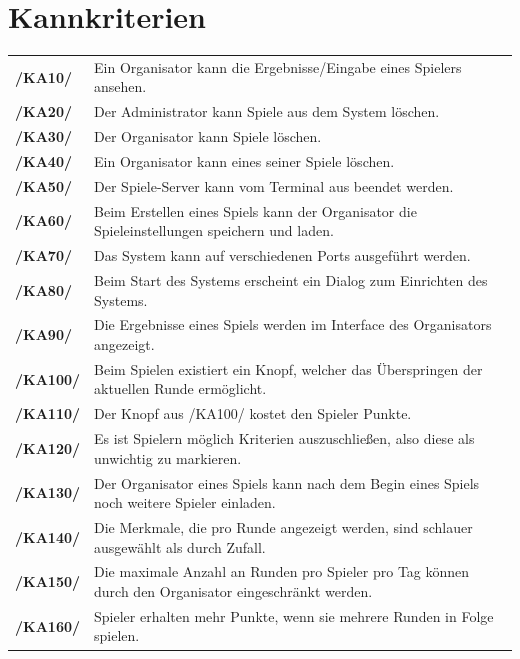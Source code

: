 \documentclass[a4paper]{scrreprt}
\begin{document}
    \section{Kannkriterien}
    \begin{tabularx}{\linewidth}{@{}>{\bfseries}l@{\hspace{.5em}}X@{}} %
        /KA10/ & Ein \Gls{Organisator} kann die Ergebnisse/Eingabe eines Spielers ansehen. \\
        /KA20/ & Der \Gls{Administrator} kann Spiele aus dem System löschen. \\
        /KA30/ & Der \Gls{Organisator} kann Spiele löschen. \\
        /KA40/ & Ein \Gls{Organisator} kann eines seiner \Gls{Spiel}e löschen. \\
        /KA50/ & Der \Gls{Spiele-Server} kann vom Terminal aus beendet werden. \\
        /KA60/ & Beim Erstellen eines Spiels kann der \Gls{Organisator} die \Gls{Spieleinstellungen} speichern und laden. \\
        /KA70/ & Das System kann auf verschiedenen Ports ausgeführt werden. \\
        /KA80/ & Beim Start des Systems erscheint ein Dialog zum Einrichten des Systems. \\
        /KA90/ & Die Ergebnisse eines \Gls{Spiel}s werden im Interface des \Gls{Organisator}s angezeigt. \\
        /KA100/ & Beim Spielen existiert ein Knopf, welcher das Überspringen der aktuellen Runde ermöglicht. \\
        /KA110/ & Der Knopf aus /KA100/ kostet den \Gls{Spieler} Punkte. \\ %
        /KA120/ & Es ist \Gls{Spieler}n möglich Kriterien auszuschließen, also diese als unwichtig zu markieren. \\
        /KA130/ & Der \Gls{Organisator} eines Spiels kann nach dem Begin eines Spiels noch weitere Spieler einladen. \\
        /KA140/ & Die Merkmale, die pro Runde angezeigt werden, sind schlauer ausgewählt als durch Zufall. \\ %
        /KA150/ & Die maximale Anzahl an Runden pro Spieler pro Tag können durch den \Gls{Organisator} eingeschränkt werden. \\
        /KA160/ & \Gls{Spieler} erhalten mehr Punkte, wenn sie mehrere Runden in Folge spielen. \\

\end{tabularx}
\end{document}
